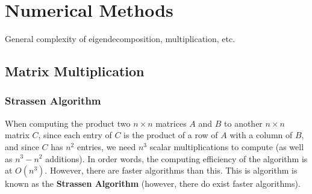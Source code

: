 \section{Numerical Methods} 

  General complexity of eigendecomposition, multiplication, etc. 

\subsection{Matrix Multiplication} 

\subsubsection{Strassen Algorithm}

  When computing the product two $n \times n$ matrices $A$ and $B$ to another $n \times n$ matrix $C$, since each entry of $C$ is the product of a row of $A$ with a column of $B$, and since $C$ has $n^2$ entries, we need $n^3$ scalar multiplications to compute (as well as $n^3 - n^2$ additions). In order words, the computing efficiency of the algorithm is at $O(n^3)$. However, there are faster algorithms than this. This is algorithm is known as the \textbf{Strassen Algorithm} (however, there do exist faster algorithms). 

